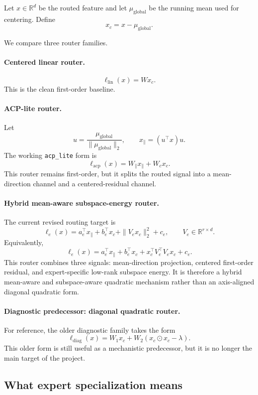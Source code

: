 \documentclass[11pt]{article}
\begin{document}
Let $x \in \mathbb{R}^d$ be the routed feature and let $\mu_{\mathrm{global}}$ be the running mean used for centering. Define
\[
x_c = x - \mu_{\mathrm{global}}.
\]

We compare three router families.

\paragraph{Centered linear router.}
\[
\ell_{\mathrm{lin}}(x) = W x_c.
\]
This is the clean first-order baseline.

\paragraph{ACP-lite router.}
Let
\[
u = \frac{\mu_{\mathrm{global}}}{\|\mu_{\mathrm{global}}\|_2},
\qquad
x_{\parallel} = (u^\top x)u.
\]
The working \texttt{acp\_lite} form is
\[
\ell_{\mathrm{acp}}(x) = W_{\parallel}x_{\parallel} + W_c x_c.
\]
This router remains first-order, but it splits the routed signal into a mean-direction channel and a centered-residual channel.

\paragraph{Hybrid mean-aware subspace-energy router.}
The current revised routing target is
\[
\ell_e(x)
=
a_e^\top x_{\parallel}
+
b_e^\top x_c
+
\|V_e x_c\|_2^2
+
c_e,
\qquad
V_e\in\mathbb{R}^{r\times d}.
\]
Equivalently,
\[
\ell_e(x)
=
a_e^\top x_{\parallel}
+
b_e^\top x_c
+
x_c^\top V_e^\top V_e x_c
+
c_e.
\]
This router combines three signals: mean-direction projection, centered first-order residual, and expert-specific low-rank subspace energy. It is therefore a hybrid mean-aware and subspace-aware quadratic mechanism rather than an axis-aligned diagonal quadratic form.

\paragraph{Diagnostic predecessor: diagonal quadratic router.}
For reference, the older diagnostic family takes the form
\[
\ell_{\mathrm{diag}}(x)=W_1 x_c + W_2(x_c\odot x_c-\lambda).
\]
This older form is still useful as a mechanistic predecessor, but it is no longer the main target of the project.

\subsection{What expert specialization means}
\end{document}

